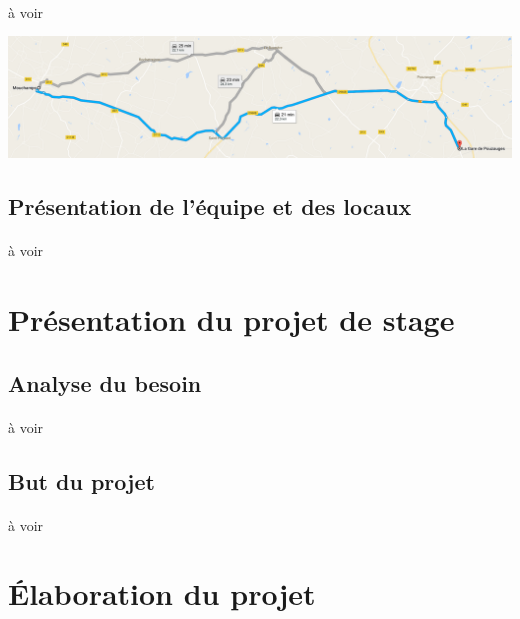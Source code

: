 \documentclass[a4paper,12pt]{extarticle}
\begin{document}
\paragraph{}
à voir\\

\centerline{\includegraphics[scale=0.40]{Img/Img_SituationGeo}}

\subsection{Présentation de l'équipe et des locaux}

\paragraph{}
à voir\\

\clearpage

\section{Présentation du projet de stage}

\subsection{Analyse du besoin}

\paragraph{}
à voir\\

\subsection{But du projet}

\paragraph{}
à voir\\

\clearpage

\section{Élaboration du projet}
\end{document}
